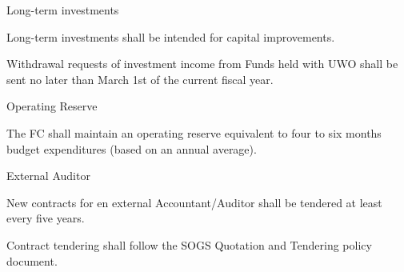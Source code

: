\begin{longenum}[ label*=\thesubsection.\arabic*., align=left]
\begin{longenum}[ label*=\arabic*., align=left]
	\end{longenum}
\item Long-term investments
	\begin{longenum}[ label*=\arabic*., align=left]
	\item Long-term investments shall be intended for capital improvements.
	\item Withdrawal requests of investment income from Funds held with UWO shall be sent no later than March 1st of the current fiscal year.
	\end{longenum}
\item Operating Reserve
	\begin{longenum}[ label*=\arabic*., align=left]
	\item The FC shall maintain an operating reserve equivalent to four to six months budget expenditures (based on an annual average). 
	\end{longenum}
\item External Auditor
	\begin{longenum}[ label*=\arabic*., align=left]
	\item New contracts for en external Accountant/Auditor shall be tendered at least every five years.
	\item Contract tendering shall follow the SOGS Quotation and Tendering policy document.
	\end{longenum}
\end{longenum}